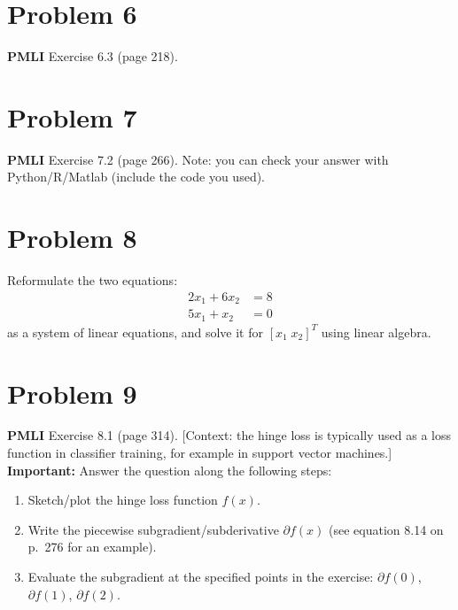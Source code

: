 \documentclass[11pt,twoside]{article}
\newcommand{\pts}[1]{\marginpar{ \small\hspace{0pt} \textit{[#1]} } }
\newcommand{\?}{\stackrel{?}{=}}
\begin{document}
\section*{Problem 6 }
\textbf{PMLI} Exercise 6.3 (page 218).
  
\section*{Problem 7 }
\textbf{PMLI} Exercise 7.2 (page 266). Note: you can check your answer with Python/R/Matlab (include the code you used).

\section*{Problem 8 }
Reformulate the two equations:
\begin{align*}
  2x_{1} + 6x_{2} &= 8 \\
  5x_{1} + x_{2} &= 0 
\end{align*}
as a system of linear equations, and solve it for $[x_{1} \; x_{2}]^{T}$ using linear algebra.

\eject
\section*{Problem 9 }
\textbf{PMLI} Exercise 8.1 (page 314). [Context: the hinge loss is typically used as a loss function in classifier training, for example in support vector machines.]
\textbf{Important:} Answer the question along the following steps:
\begin{enumerate}[\bf (a)]
\item Sketch/plot the hinge loss function $f(x)$.\pts{2}
\item Write the piecewise subgradient/subderivative \pts{2} $\partial f(x)$ (see equation 8.14 on p.\ 276 for an example).
\item Evaluate the subgradient at the specified \pts{3} points in the exercise: $\partial f(0)$, $\partial f(1)$, $\partial f(2)$.
\end{enumerate}

 
\end{document}
